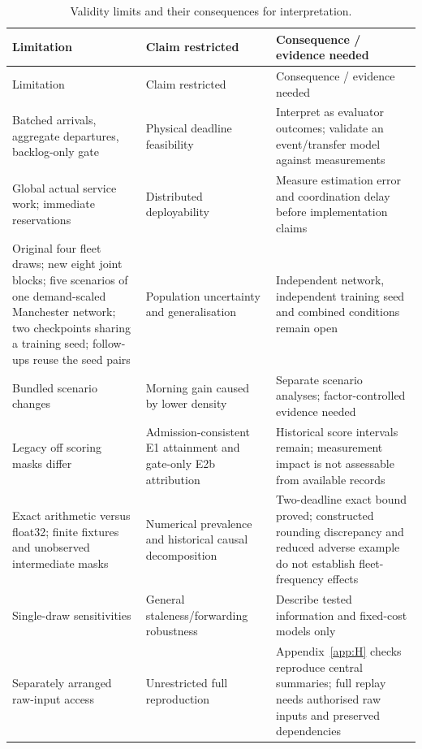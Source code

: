 \documentclass[12pt,a4paper]{article}
\begin{document}
\begingroup
\singlespacing\footnotesize\setlength{\tabcolsep}{3pt}
\renewcommand{\thetable}{8}
\begin{xltabular}{\textwidth}{@{}YYY@{}}
\caption[Validity limits]{Validity limits and their consequences for interpretation.}\label{tab:8} \\
\toprule
Limitation & Claim restricted & Consequence / evidence needed \\
\midrule\endfirsthead
\toprule
Limitation & Claim restricted & Consequence / evidence needed \\
\midrule\endhead
\bottomrule\endfoot
Batched arrivals, aggregate departures, backlog-only gate & Physical deadline feasibility & Interpret as evaluator outcomes; validate an event/transfer model against measurements \\
Global actual service work; immediate reservations & Distributed deployability & Measure estimation error and coordination delay before implementation claims \\
Original four fleet draws; new eight joint blocks; five scenarios of one demand-scaled Manchester network; two checkpoints sharing a training seed; follow-ups reuse the seed pairs & Population uncertainty and generalisation & Independent network, independent training seed and combined conditions remain open \\
Bundled scenario changes & Morning gain caused by lower density & Separate scenario analyses; factor-controlled evidence needed \\
Legacy off scoring masks differ & Admission-consistent E1 attainment and gate-only E2b attribution & Historical score intervals remain; measurement impact is not assessable from available records \\
Exact arithmetic versus float32; finite fixtures and unobserved intermediate masks & Numerical prevalence and historical causal decomposition & Two-deadline exact bound proved; constructed rounding discrepancy and reduced adverse example do not establish fleet-frequency effects \\
Single-draw sensitivities & General staleness/forwarding robustness & Describe tested information and fixed-cost models only \\
Separately arranged raw-input access & Unrestricted full reproduction & Appendix~\ref{app:H} checks reproduce central summaries; full replay needs authorised raw inputs and preserved dependencies \\
\end{xltabular}
\endgroup
\end{document}
